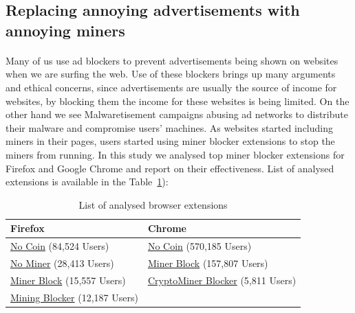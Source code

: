 \documentclass[letterpaper]{scrartcl} %
\numberwithin{equation}{section} %
\numberwithin{figure}{section} %
\numberwithin{table}{section} %
\begin{document}
\subsection{Replacing annoying advertisements with annoying miners}
\paragraph{}
Many of us use ad blockers to prevent advertisements being shown on websites when we are surfing the web. Use of these blockers brings up many arguments and ethical concerns, since advertisements are usually the source of income for websites, by blocking them the income for these websites is being limited. On the other hand we see Malwaretisement campaigns abusing ad networks to distribute their malware and compromise users' machines. As websites started including miners in their pages, users started using miner blocker extensions to stop the miners from running. In this study we analysed top miner blocker extensions for Firefox and Google Chrome and report on their effectiveness. List of analysed extensions is available in the Table~\ref{tab:analysed-extensions}):

\begin{table}[]
\centering
\caption{List of analysed browser extensions}
\label{tab:analysed-extensions}
\begin{tabular}{lc}
\hline
\multicolumn{1}{|l|}{\textbf{Firefox}}                        & \multicolumn{1}{|l|}{\textbf{Chrome}} \\ \hline
\multicolumn{1}{|l|}{\href{https://addons.mozilla.org/en-US/firefox/addon/no-coin/}{No Coin} (84,524 Users)}         & \multicolumn{1}{|l|}{\href{https://chrome.google.com/webstore/detail/no-coin-block-miners-on-t/gojamcfopckidlocpkbelmpjcgmbgjcl?hl=en}{No Coin} (570,185 Users)}    \\ \hline
\multicolumn{1}{|l|}{\href{https://addons.mozilla.org/en-US/firefox/addon/nominer-block-coin-miners/}{No Miner} (28,413 Users)}        & \multicolumn{1}{|l|}{\href{https://chrome.google.com/webstore/detail/minerblock/emikbbbebcdfohonlaifafnoanocnebl?hl=en}{Miner Block} (157,807 Users)} \\ \hline
\multicolumn{1}{|l|}{\href{https://addons.mozilla.org/en-US/firefox/addon/minerblock-origin/}{Miner Block} (15,557 Users)}     & \multicolumn{1}{|l|}{\href{https://chrome.google.com/webstore/detail/crypto-miner-blocker/fekkecoifalagdiibmfnmjfmgmpblogb?hl=en}{CryptoMiner Blocker} (5,811 Users)}     \\ \hline
\multicolumn{1}{|l|}{\href{https://addons.mozilla.org/en-US/firefox/addon/miningblocker/}{Mining Blocker} (12,187 Users)}  & \multicolumn{1}{|l|}{} \\ \hline
\end{tabular}
\end{table}
\end{document}
